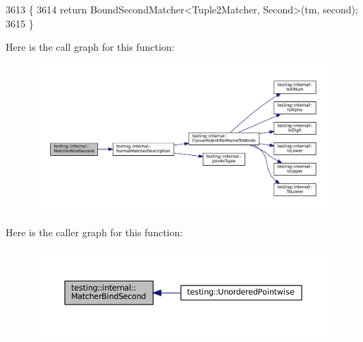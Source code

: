 \begin{DoxyCode}
3613                                                    \{
3614   \textcolor{keywordflow}{return} BoundSecondMatcher<Tuple2Matcher, Second>(tm, second);
3615 \}
\end{DoxyCode}
Here is the call graph for this function\+:
\nopagebreak
\begin{figure}[H]
\begin{center}
\leavevmode
\includegraphics[width=350pt]{namespacetesting_1_1internal_a31eb77a2bb0ca713d6ef07d8a3b9af9e_cgraph}
\end{center}
\end{figure}
Here is the caller graph for this function\+:
\nopagebreak
\begin{figure}[H]
\begin{center}
\leavevmode
\includegraphics[width=350pt]{namespacetesting_1_1internal_a31eb77a2bb0ca713d6ef07d8a3b9af9e_icgraph}
\end{center}
\end{figure}
\mbox{\label{namespacetesting_1_1internal_a0821df2611d54c79bac990719ad8a2dd}} 
